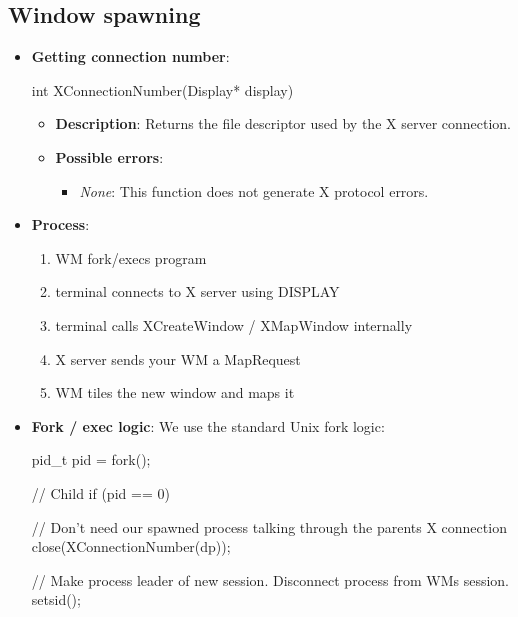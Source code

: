 \documentclass{report}
\begin{document}
    \subsection{Window spawning}
    \begin{itemize}
        \item \textbf{Getting connection number}:
            \bigbreak \noindent 
            \begin{cppcode}
                int XConnectionNumber(Display* display)
            \end{cppcode}
            \begin{itemize}
                \item \textbf{Description}: Returns the file descriptor used by the X server connection.
                \item \textbf{Possible errors}:
                    \begin{itemize}
                        \item \textit{None}: This function does not generate X protocol errors.
                    \end{itemize}
            \end{itemize}

        \item \textbf{Process}: 
            \begin{enumerate}
                \item WM fork/execs program
                \item terminal connects to X server using DISPLAY
                \item terminal calls XCreateWindow / XMapWindow internally
                \item X server sends your WM a MapRequest
                \item WM tiles the new window and maps it
            \end{enumerate}
        \item \textbf{Fork / exec logic}: We use the standard Unix fork logic:
            \bigbreak \noindent 
            \begin{bashcode}
            pid_t pid = fork();

            // Child
            if (pid == 0) {
                // Don't need our spawned process talking through the parents X connection
                close(XConnectionNumber(dp));

                // Make process leader of new session. Disconnect process from WMs session.
                setsid();

}
\end{bashcode}
\end{itemize}
\end{document}
